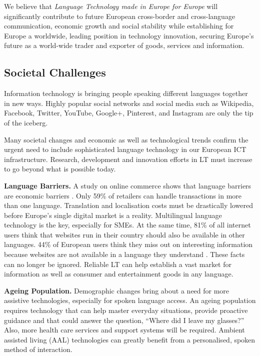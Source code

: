 \documentclass[10pt, plain]{../../metanetpaper}
\begin{document}
\begin{multicols}{2}
We believe that \emph{Language Technology made in Europe for Europe} will significantly contribute to future European cross-border and cross-language communication, economic growth \cite{economist12} and social stability while establishing for Europe a worldwide, leading position in technology innovation, securing Europe's future as a world-wide trader and exporter of goods, services and information.

\subsection{Societal Challenges}
\label{sec:what-soci-challenges}

Information technology is bringing people speaking different languages together in new ways. Highly popular social networks and social media such as Wikipedia, Facebook, Twitter, YouTube, Google+, Pinterest, and Instagram are only the tip of the iceberg.

Many societal changes and economic as well as technological trends confirm the urgent need to include sophisticated language technology in our European ICT infrastructure. Research, development and innovation efforts in LT must increase to go beyond what is possible today.

\textbf{Language Barriers.} A study on online commerce shows that language barriers are economic barriers \cite{EC4}. Only 59\% of retailers can handle transactions in more than one language. Translation and localisation costs must be drastically lowered before Europe’s single digital market is a reality. Multilingual language technology is the key, especially for SMEs. At the same time, 81\% of all internet users think that websites run in their country should also be available in other languages. 44\% of European users think they miss out on interesting information because websites are not available in a language they understand \cite{EC1}. These facts can no longer be ignored. Reliable LT can help establish a vast market for information as well as consumer and entertainment goods in any language.

\textbf{Ageing Population.} Demographic changes bring about a need for more assistive technologies, especially for spoken language access. An ageing population requires technology that can help master everyday situations, provide proactive guidance and that could answer the question, “Where did I leave my glasses?” Also, more health care services and support systems will be required. Ambient assisted living (AAL) technologies can greatly benefit from a personalised, spoken method of interaction.


\end{multicols}
\end{document}
